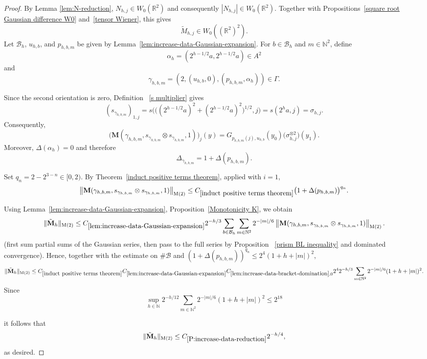 \documentclass[12pt,reqno]{amsart}
\theoremstyle{plain}
\numberwithin{equation}{section}
\theoremstyle{remark}
\newcommand{\N}{{\mathbb N}}
\newcommand{\M}{\mathbf{M}}
\newcommand{\ls}[1]{{\color{red}{[L: #1]}}}
\newcommand{\jr}[1]{{\color{orange}{[J: #1]}}}
\begin{document}
\begin{proof}
\ls{todo}\jr{what is todo?}

By Lemma \ref{lem:N-reduction}, \(N_{h,j}\in W_0(\mathbb R^2)\) and consequently $|N_{h,j}|\in W_0(\mathbb R^2)$. Together with Propositions~\ref{square root Gaussian difference W0}
and~\ref{tensor Wiener}, this gives
\[
\tilde M_{h,j}\in W_0((\mathbb R^2)^2).
\]
Let \(\mathcal B_h\), \(u_{h,b}\), and \(p_{h,b,m}\) be given by
Lemma~\ref{lem:increase-data-Gaussian-expansion}. For
\(b\in\mathcal B_h\) and \(m\in\mathbb N^2\), define
\[
\alpha_h
=
\left(
2^{h-1/2}a,
2^{h-1/2}a
\right)\in A^2
\]
and
\[
\gamma_{h,b,m}
=
\left(
2,
(u_{h,b},0),
(p_{h,b,m},\alpha_h)
\right)\in\Gamma.
\]

Since the second orientation is zero, Definition~
\ref{s multiplier} gives
\[
(s_{\gamma_{h,b,m}})_{1,j}
=
s\Big(
\big(
(2^{h-1/2}a)^2+
(2^{h-1/2}a)^2
\big )^{1/2},
j
\Big)
=
s(2^ha,j)
=
\sigma_{h,j}.
\]
Consequently,
\begin{equation}
    \label{E:increase-data-positive-term-recognition}
    \bigl(
    \M(
    \gamma_{h,b,m},
    s_{\gamma_{h,b,m}}\otimes s_{\gamma_{h,b,m}},
    1
    )
    \bigr)_j(y) =
    G_{p_{h,b,m}(j),u_{h,b}}(y_0)
    \bigl(\sigma_{h,j}^{\otimes2}\bigr)(y_1).
\end{equation}
Moreover,
$\Delta(\alpha_h)=0$
and therefore
\[ \Delta_{\gamma_{h,b,m}} =
1+\Delta(p_{h,b,m}). \]

Set $
q_n=2-2^{3-n}\in[0,2).$
By Theorem~\ref{induct positive terms theorem}, applied with
\(i=1\),
\[
\left\|
\M(
\gamma_{h,b,m},
s_{\gamma_{h,b,m}}\otimes s_{\gamma_{h,b,m}},
1
)
\right\|_{\mathrm M(2)}
 \leq
C_{\ref{induct positive terms theorem}}
\bigl(
1+\Delta(p_{h,b,m})
\bigr)^{q_n}.
\]

Using Lemma~\ref{lem:increase-data-Gaussian-expansion},
Proposition~\ref{Monotonicity K}, we obtain
\[
\|\tilde{\mathbf M}_h\|_{\mathrm M(2)}
\leq
C_{\ref{lem:increase-data-Gaussian-expansion}}
2^{-h/3}
\sum_{b\in\mathcal B_h}
\sum_{m\in\mathbb N^2}
2^{-|m|/6}
\left\|
\M(
\gamma_{h,b,m},
s_{\gamma_{h,b,m}}\otimes s_{\gamma_{h,b,m}},
1
)
\right\|_{\mathrm M(2)}.
\]
(first sum partial
sums of the Gaussian series, then pass to the full series by Proposition~
\ref{prism BL inequality} and dominated convergence). Hence, together with the estimate on $\#\mathcal{B}$ and $(1+\Delta(p_{h,b,m}))^{q_n}\le 2^{4}(1+h+|m|)^2$,
\[
\|\tilde{\mathbf M}_h\|_{\mathrm M(2)}
\leq
C_{\ref{induct positive terms theorem}}C_{\ref{lem:increase-data-Gaussian-expansion}}C_{\ref{lem:increase-data-bracket-domination},0}2^4
2^{-h/3}
\sum_{m\in\mathbb N^2}
2^{-|m|/6}
(1+h+|m|)^{2}.
\]
Since
\[\sup_{h\in \N}2^{-h/12}\sum_{m\in \N^2}2^{-|m|/6}(1+h+|m|)^2\le 2^{18}\]


it follows that
\[
\|\tilde{\mathbf M}_h\|_{\mathrm M(2)}
\leq
C_{\ref{P:increase-data-reduction}}2^{-h/4},
\]
as desired.
\end{proof}
\end{document}
